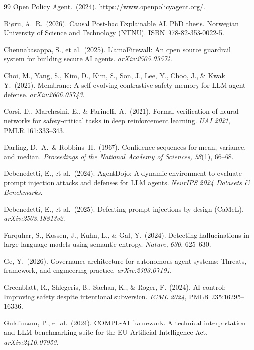 \documentclass[10pt,twocolumn]{article}
\begin{document}
\begin{thebibliography}{99}
Open Policy Agent.\ (2024).
\url{https://www.openpolicyagent.org/}.

Bjøru, A.~R.\ (2026).
Causal Post-hoc Explainable AI.
PhD thesis, Norwegian University of Science and Technology (NTNU).
ISBN~978-82-353-0022-5.

Chennabasappa, S., et al.\ (2025).
LlamaFirewall: An open source guardrail system for building secure AI agents.
\emph{arXiv:2505.03574}.

Choi, M., Yang, S., Kim, D., Kim, S., Son, J., Lee, Y., Choo, J.,
\& Kwak, Y.\ (2026).
Membrane: A self-evolving contrastive safety memory for LLM agent defense.
\emph{arXiv:2606.05743}.

Corsi, D., Marchesini, E., \& Farinelli, A.\ (2021).
Formal verification of neural networks for safety-critical tasks in deep
reinforcement learning.
\emph{UAI 2021}, PMLR 161:333--343.

Darling, D.~A.\ \& Robbins, H.\ (1967).
Confidence sequences for mean, variance, and median.
\emph{Proceedings of the National Academy of Sciences, 58}(1), 66--68.

Debenedetti, E., et al.\ (2024).
AgentDojo: A dynamic environment to evaluate prompt injection attacks and
defenses for LLM agents.
\emph{NeurIPS 2024 Datasets \& Benchmarks}.

Debenedetti, E., et al.\ (2025).
Defeating prompt injections by design (CaMeL).
\emph{arXiv:2503.18813v2}.

Farquhar, S., Kossen, J., Kuhn, L., \& Gal, Y.\ (2024).
Detecting hallucinations in large language models using semantic entropy.
\emph{Nature, 630}, 625--630.

Ge, Y.\ (2026).
Governance architecture for autonomous agent systems: Threats, framework,
and engineering practice.
\emph{arXiv:2603.07191}.

Greenblatt, R., Shlegeris, B., Sachan, K., \& Roger, F.\ (2024).
AI control: Improving safety despite intentional subversion.
\emph{ICML 2024}, PMLR 235:16295--16336.

Guldimann, P., et al.\ (2024).
COMPL-AI framework: A technical interpretation and LLM benchmarking suite
for the EU Artificial Intelligence Act.
\emph{arXiv:2410.07959}.


\end{thebibliography}
\end{document}
